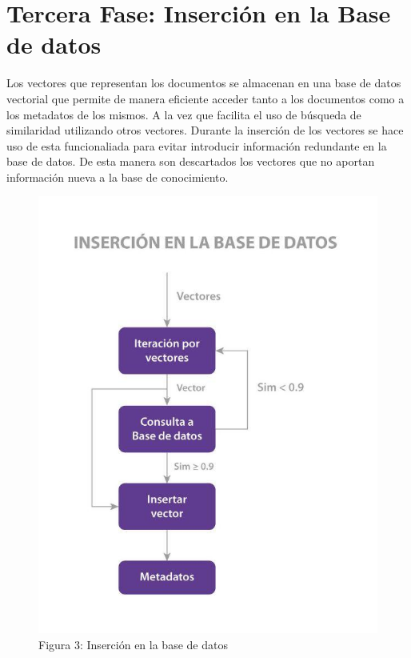     \section{Tercera Fase: Inserción en la Base de datos}
    Los vectores que representan los documentos se almacenan en una base de datos vectorial que permite de manera eficiente acceder tanto a los documentos como a los metadatos de los mismos. A la vez que facilita el uso de búsqueda de similaridad utilizando otros vectores. Durante la inserción de los vectores se hace uso de esta funcionaliada para evitar introducir información redundante en la base de datos. De esta manera son descartados los vectores que no aportan información nueva a la base de conocimiento.

    \begin{figure}[H]    
        \centering
        \includegraphics[scale = 0.25]{Figures/pipeline_2.jpg}
        \caption*{Figura 3: Inserción en la base de datos}
    \end{figure}

